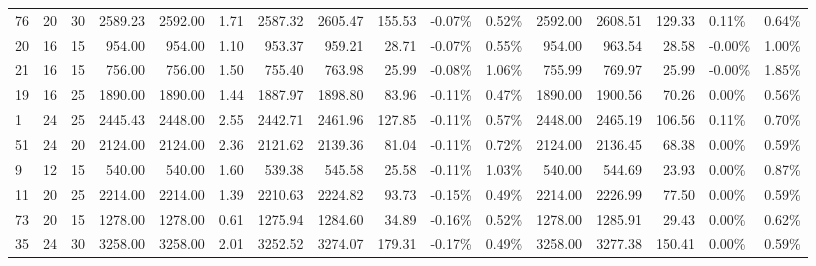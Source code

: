 \begin{tabular}{lllrrrrrrllrrrll}
76 &  20 &  30 &   2589.23 &    2592.00 &        1.71 &       2587.32 &        2605.47 &          155.53 &           -0.07\% &             0.52\% &       2592.00 &        2608.51 &          129.33 &            0.11\% &             0.64\% \\
20 &  16 &  15 &    954.00 &     954.00 &        1.10 &        953.37 &         959.21 &           28.71 &           -0.07\% &             0.55\% &        954.00 &         963.54 &           28.58 &           -0.00\% &             1.00\% \\
21 &  16 &  15 &    756.00 &     756.00 &        1.50 &        755.40 &         763.98 &           25.99 &           -0.08\% &             1.06\% &        755.99 &         769.97 &           25.99 &           -0.00\% &             1.85\% \\
19 &  16 &  25 &   1890.00 &    1890.00 &        1.44 &       1887.97 &        1898.80 &           83.96 &           -0.11\% &             0.47\% &       1890.00 &        1900.56 &           70.26 &            0.00\% &             0.56\% \\
1  &  24 &  25 &   2445.43 &    2448.00 &        2.55 &       2442.71 &        2461.96 &          127.85 &           -0.11\% &             0.57\% &       2448.00 &        2465.19 &          106.56 &            0.11\% &             0.70\% \\
51 &  24 &  20 &   2124.00 &    2124.00 &        2.36 &       2121.62 &        2139.36 &           81.04 &           -0.11\% &             0.72\% &       2124.00 &        2136.45 &           68.38 &            0.00\% &             0.59\% \\
9  &  12 &  15 &    540.00 &     540.00 &        1.60 &        539.38 &         545.58 &           25.58 &           -0.11\% &             1.03\% &        540.00 &         544.69 &           23.93 &            0.00\% &             0.87\% \\
11 &  20 &  25 &   2214.00 &    2214.00 &        1.39 &       2210.63 &        2224.82 &           93.73 &           -0.15\% &             0.49\% &       2214.00 &        2226.99 &           77.50 &            0.00\% &             0.59\% \\
73 &  20 &  15 &   1278.00 &    1278.00 &        0.61 &       1275.94 &        1284.60 &           34.89 &           -0.16\% &             0.52\% &       1278.00 &        1285.91 &           29.43 &            0.00\% &             0.62\% \\
35 &  24 &  30 &   3258.00 &    3258.00 &        2.01 &       3252.52 &        3274.07 &          179.31 &           -0.17\% &             0.49\% &       3258.00 &        3277.38 &          150.41 &            0.00\% &             0.59\% \\

\end{tabular}
